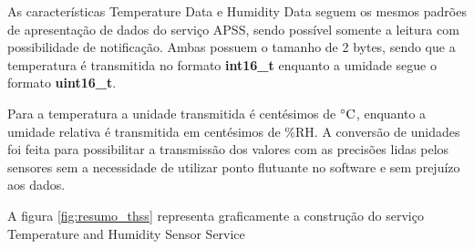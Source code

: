 As características Temperature Data e Humidity Data seguem os mesmos padrões de
apresentação de dados do serviço APSS, sendo possível somente a leitura com
possibilidade de notificação. Ambas possuem o tamanho de 2 bytes, sendo que a
temperatura é transmitida no formato \textbf{int16\_t} enquanto a umidade segue
o formato \textbf{uint16\_t}.

Para a temperatura a unidade transmitida é centésimos de $^{\circ}{\rm C}$,
enquanto a umidade relativa é transmitida em centésimos de \%RH. A conversão de
unidades foi feita para possibilitar a transmissão dos valores com as precisões
lidas pelos sensores sem a necessidade de utilizar ponto flutuante no software e
sem prejuízo aos dados.

A figura \ref{fig:resumo_thss} representa graficamente a construção do serviço
Temperature and Humidity Sensor Service

